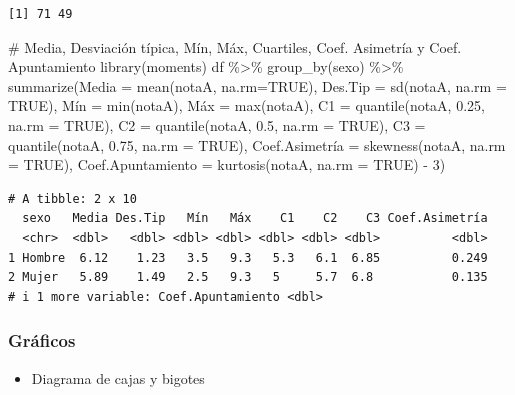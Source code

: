 \documentclass[
  spanish,
  a4paper,
]{scrreport}
\newenvironment{Shaded}{\begin{snugshade}}{\end{snugshade}}
\newcommand{\AttributeTok}[1]{\textcolor[rgb]{0.40,0.45,0.13}{#1}}
\newcommand{\CommentTok}[1]{\textcolor[rgb]{0.37,0.37,0.37}{#1}}
\newcommand{\ConstantTok}[1]{\textcolor[rgb]{0.56,0.35,0.01}{#1}}
\newcommand{\DecValTok}[1]{\textcolor[rgb]{0.68,0.00,0.00}{#1}}
\newcommand{\FloatTok}[1]{\textcolor[rgb]{0.68,0.00,0.00}{#1}}
\newcommand{\FunctionTok}[1]{\textcolor[rgb]{0.28,0.35,0.67}{#1}}
\newcommand{\NormalTok}[1]{\textcolor[rgb]{0.00,0.23,0.31}{#1}}
\newcommand{\OtherTok}[1]{\textcolor[rgb]{0.00,0.23,0.31}{#1}}
\newcommand{\SpecialCharTok}[1]{\textcolor[rgb]{0.37,0.37,0.37}{#1}}
\providecommand{\tightlist}{%
  \setlength{\itemsep}{0pt}\setlength{\parskip}{0pt}}
\theoremstyle{definition}
\theoremstyle{definition}
\theoremstyle{remark}
\begin{document}
\begin{verbatim}
[1] 71 49
\end{verbatim}

\begin{Shaded}
\begin{Highlighting}[]
\CommentTok{\# Media, Desviación típica, Mín, Máx, Cuartiles, Coef. Asimetría y Coef. Apuntamiento}
\FunctionTok{library}\NormalTok{(moments)}
\NormalTok{df }\SpecialCharTok{\%\textgreater{}\%} \FunctionTok{group\_by}\NormalTok{(sexo) }\SpecialCharTok{\%\textgreater{}\%} \FunctionTok{summarize}\NormalTok{(}\AttributeTok{Media =} \FunctionTok{mean}\NormalTok{(notaA, }\AttributeTok{na.rm=}\ConstantTok{TRUE}\NormalTok{), }\AttributeTok{Des.Tip =} \FunctionTok{sd}\NormalTok{(notaA, }\AttributeTok{na.rm =} \ConstantTok{TRUE}\NormalTok{), Mín }\OtherTok{=} \FunctionTok{min}\NormalTok{(notaA), Máx }\OtherTok{=} \FunctionTok{max}\NormalTok{(notaA), }\AttributeTok{C1 =} \FunctionTok{quantile}\NormalTok{(notaA, }\FloatTok{0.25}\NormalTok{, }\AttributeTok{na.rm =} \ConstantTok{TRUE}\NormalTok{), }\AttributeTok{C2 =} \FunctionTok{quantile}\NormalTok{(notaA, }\FloatTok{0.5}\NormalTok{, }\AttributeTok{na.rm =} \ConstantTok{TRUE}\NormalTok{), }\AttributeTok{C3 =} \FunctionTok{quantile}\NormalTok{(notaA, }\FloatTok{0.75}\NormalTok{, }\AttributeTok{na.rm =} \ConstantTok{TRUE}\NormalTok{), Coef.Asimetría }\OtherTok{=} \FunctionTok{skewness}\NormalTok{(notaA, }\AttributeTok{na.rm =} \ConstantTok{TRUE}\NormalTok{), }\AttributeTok{Coef.Apuntamiento =} \FunctionTok{kurtosis}\NormalTok{(notaA, }\AttributeTok{na.rm =} \ConstantTok{TRUE}\NormalTok{) }\SpecialCharTok{{-}} \DecValTok{3}\NormalTok{)}
\end{Highlighting}
\end{Shaded}

\begin{verbatim}
# A tibble: 2 x 10
  sexo   Media Des.Tip   Mín   Máx    C1    C2    C3 Coef.Asimetría
  <chr>  <dbl>   <dbl> <dbl> <dbl> <dbl> <dbl> <dbl>          <dbl>
1 Hombre  6.12    1.23   3.5   9.3   5.3   6.1  6.85          0.249
2 Mujer   5.89    1.49   2.5   9.3   5     5.7  6.8           0.135
# i 1 more variable: Coef.Apuntamiento <dbl>
\end{verbatim}

\subsubsection{Gráficos}\label{gruxe1ficos-2}

\begin{itemize}
\tightlist
\item
  Diagrama de cajas y bigotes
\end{itemize}
\end{document}
